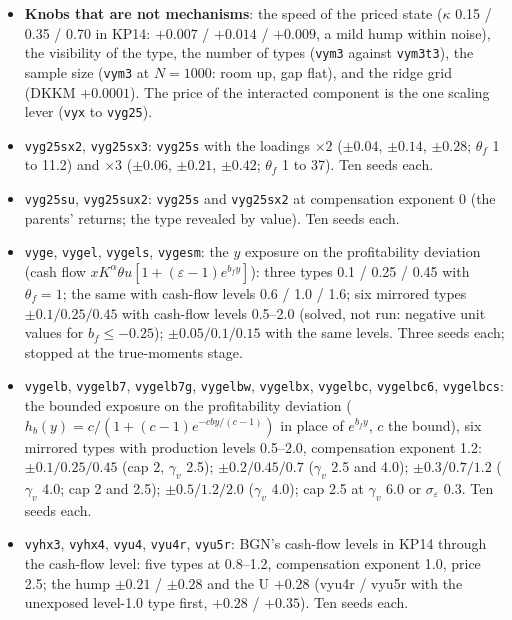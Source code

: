 \documentclass[11pt]{article}
\begin{document}
\begin{itemize}
\item \textbf{Knobs that are not mechanisms}: the speed of the priced state ($\kappa$ 0.15 / 0.35 / 0.70 in KP14: $+0.007$ / $+0.014$ / $+0.009$, a mild hump within noise), the visibility of the type, the number of types (\texttt{vym3} against \texttt{vym3t3}), the sample size (\texttt{vym3} at $N=1000$: room up, gap flat), and the ridge grid (DKKM $+0.0001$). The price of the interacted component is the one scaling lever (\texttt{vyx} to \texttt{vyg25}).
\item \texttt{vyg25sx2}, \texttt{vyg25sx3}: \texttt{vyg25s} with the loadings $\times2$ ($\pm0.04$, $\pm0.14$, $\pm0.28$; $\theta_f$ 1 to 11.2) and $\times3$ ($\pm0.06$, $\pm0.21$, $\pm0.42$; $\theta_f$ 1 to 37). Ten seeds each.
\item \texttt{vyg25su}, \texttt{vyg25sux2}: \texttt{vyg25s} and \texttt{vyg25sx2} at compensation exponent 0 (the parents' returns; the type revealed by value). Ten seeds each.
\item \texttt{vyge}, \texttt{vygel}, \texttt{vygels}, \texttt{vygesm}: the $y$ exposure on the profitability deviation (cash flow $x K^\alpha \theta u [1 + (\varepsilon-1) e^{b_f y}]$): three types 0.1 / 0.25 / 0.45 with $\theta_f=1$; the same with cash-flow levels 0.6 / 1.0 / 1.6; six mirrored types $\pm0.1/0.25/0.45$ with cash-flow levels 0.5--2.0 (solved, not run: negative unit values for $b_f\le-0.25$); $\pm0.05/0.1/0.15$ with the same levels. Three seeds each; stopped at the true-moments stage.
\item \texttt{vygelb}, \texttt{vygelb7}, \texttt{vygelb7g}, \texttt{vygelbw}, \texttt{vygelbx}, \texttt{vygelbc}, \texttt{vygelbc6}, \texttt{vygelbcs}: the bounded exposure on the profitability deviation ($h_b(y) = c/(1+(c-1)e^{-cby/(c-1)})$ in place of $e^{b_f y}$, $c$ the bound), six mirrored types with production levels 0.5--2.0, compensation exponent 1.2: $\pm0.1/0.25/0.45$ (cap 2, $\gamma_v$ 2.5); $\pm0.2/0.45/0.7$ ($\gamma_v$ 2.5 and 4.0); $\pm0.3/0.7/1.2$ ($\gamma_v$ 4.0; cap 2 and 2.5); $\pm0.5/1.2/2.0$ ($\gamma_v$ 4.0); cap 2.5 at $\gamma_v$ 6.0 or $\sigma_\varepsilon$ 0.3. Ten seeds each.
\item \texttt{vyhx3}, \texttt{vyhx4}, \texttt{vyu4}, \texttt{vyu4r}, \texttt{vyu5r}: BGN's cash-flow levels in KP14 through the cash-flow level: five types at 0.8--1.2, compensation exponent 1.0, price 2.5; the hump $\pm0.21$ / $\pm0.28$ and the U $+0.28$ (vyu4r / vyu5r with the unexposed level-1.0 type first, $+0.28$ / $+0.35$). Ten seeds each.

\end{itemize}
\end{document}
